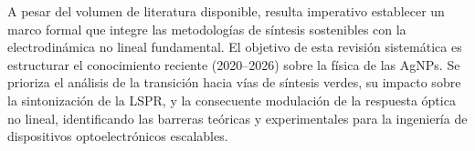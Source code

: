 A pesar del volumen de literatura disponible, resulta imperativo establecer un
marco formal que integre las metodologías de síntesis sostenibles con la
electrodinámica no lineal fundamental. El objetivo de esta revisión sistemática
es estructurar el conocimiento reciente (2020--2026) sobre la física de las
AgNPs. Se prioriza el análisis de la transición hacia vías de síntesis verdes,
su impacto sobre la sintonización de la LSPR, y la consecuente modulación de la
respuesta óptica no lineal, identificando las barreras teóricas y experimentales
para la ingeniería de dispositivos optoelectrónicos escalables.
